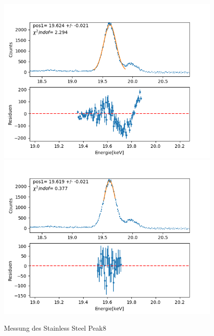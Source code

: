 \documentclass[12pt,a4paper]{article}
\begin{document}
\begin{figure}[H]
\centering
\includegraphics[scale=0.49]{Bilder/roentgen_spektren/stahl/rub8_1.png}
\includegraphics[scale=0.49]{Bilder/roentgen_spektren/stahl/rub8_2.png}
\caption{Messung des Stainless Steel Peak8}
\end{figure}
\end{document}

